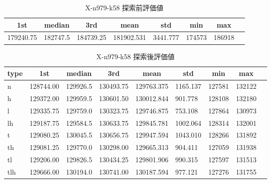 \begin{table}[htbp]
    \centering
    \caption{X-n979-k58 探索前評価値}
    \begin{tabular}{|l|l|l|l|l|l|l|l|}\hline
    \multicolumn{1}{|c|}{\textbf{1st}}
    &\multicolumn{1}{c|}{\textbf{median}}
    &\multicolumn{1}{c|}{\textbf{3rd}}
    &\multicolumn{1}{c|}{\textbf{mean}}
    &\multicolumn{1}{c|}{\textbf{std}}
    &\multicolumn{1}{c|}{\textbf{min}}
    &\multicolumn{1}{c|}{\textbf{max}}\\\hline
	179240.75 & 182747.5 & 184739.25 & 181902.531 & 3441.777 & 174573 & 186918\\\hline
	\end{tabular}
\end{table}
\begin{table}[htbp]
    \centering
    \caption{X-n979-k58 探索後評価値}
    \begin{tabular}{|l|l|l|l|l|l|l|l|l|}\hline
    \multicolumn{1}{|c|}{\textbf{type}}
    &\multicolumn{1}{|c|}{\textbf{1st}}
    &\multicolumn{1}{c|}{\textbf{median}}
    &\multicolumn{1}{c|}{\textbf{3rd}}
    &\multicolumn{1}{c|}{\textbf{mean}}
    &\multicolumn{1}{c|}{\textbf{std}}
    &\multicolumn{1}{c|}{\textbf{min}}
    &\multicolumn{1}{c|}{\textbf{max}}\\\hline
	n & 128744.00 & 129926.5 & 130493.75 & 129763.375 & 1165.137 & 127581 & 132122\\\hline
	h & 129372.00 & 129959.5 & 130601.50 & 130012.844 & 901.778 & 128108 & 132180\\\hline
	l & 129335.75 & 129759.0 & 130323.75 & 129746.875 & 753.108 & 127864 & 130973\\\hline
	lh & 129187.75 & 129584.5 & 130633.75 & 129845.781 & 1002.064 & 128314 & 132001\\\hline
	t & 129080.25 & 130045.5 & 130656.75 & 129947.594 & 1043.010 & 128266 & 131892\\\hline
	th & 129081.25 & 129770.0 & 130298.00 & 129665.313 & 904.411 & 127059 & 131938\\\hline
	tl & 129206.00 & 129826.5 & 130434.25 & 129801.906 & 990.315 & 127597 & 131513\\\hline
	tlh & 129666.00 & 130194.0 & 130741.00 & 130187.594 & 977.121 & 127276 & 131755\\\hline
	\end{tabular}
\end{table}
